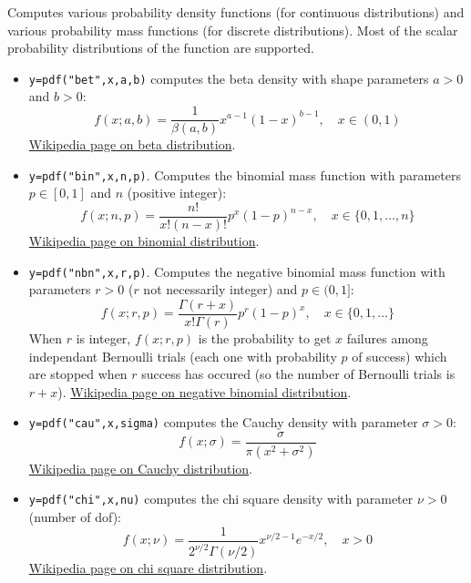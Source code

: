 \begin{mandescription}
  Computes various probability density functions (for continuous
  distributions) 
  and various probability mass functions (for discrete distributions). Most of the
  scalar probability distributions of the 
  function are supported. 
\begin{itemize}

\item {}  \verb!y=pdf("bet",x,a,b)! computes the beta
  density with shape parameters $a > 0$ and $b > 0$:
$$
     f(x; a, b) =
        \frac{1}{\beta(a,b)} x^{a-1}(1-x)^{b-1}, \quad x \in (0,1)
$$
\href{http://en.wikipedia.org/wiki/Beta_distribution}{Wikipedia page on beta distribution}.

\item {} \verb!y=pdf("bin",x,n,p)!. Computes
  the binomial mass function with parameters $p \in [0,1]$ and $n$
  (positive integer):
$$
     f(x; n, p) = \frac{ n! }{ x! (n-x)!} p^x (1-p)^{n-x}, \quad x \in \{0,1,\dots,n\}
$$
\href{http://en.wikipedia.org/wiki/Binomial_distribution}{Wikipedia page on binomial distribution}.

\item {} \verb!y=pdf("nbn",x,r,p)!. Computes
  the negative binomial mass function with parameters $r > 0$ ($r$ not
  necessarily integer) and $p \in (0,1]$:
$$
     f(x; r, p) = \frac{ \Gamma(r+x) }{ x! \Gamma(r)} p^r (1-p)^x, \quad x \in \{0,1,\dots\}
$$
  When $r$ is integer, $f(x; r, p)$ is the probability to get $x$ failures among 
 independant Bernoulli trials (each one with probability $p$ of success) which are
 stopped when $r$ success has occured (so the number of Bernoulli trials is $r+x$).  
\href{http://en.wikipedia.org/wiki/Negative_binomial_distribution}{Wikipedia page on negative binomial distribution}.

\item {} \verb!y=pdf("cau",x,sigma)! computes the Cauchy
  density with parameter $\sigma > 0$:
$$
     f(x; \sigma) = \frac{ \sigma }{ \pi ( x^2 + \sigma^2 ) }
$$
\href{http://en.wikipedia.org/wiki/Cauchy_distribution}{Wikipedia page on Cauchy distribution}.

\item {} \verb!y=pdf("chi",x,nu)! computes the chi square
  density with parameter $\nu > 0$ (number of dof):
$$
     f(x; \nu) = \frac{1}{2^{\nu/2} \Gamma(\nu/2)} x^{\nu/2-1} e^{-x/2}, \quad x > 0 
$$
\href{http://en.wikipedia.org/wiki/Chi_square_distribution}{Wikipedia page on chi square distribution}.


\end{itemize}
\end{mandescription}

